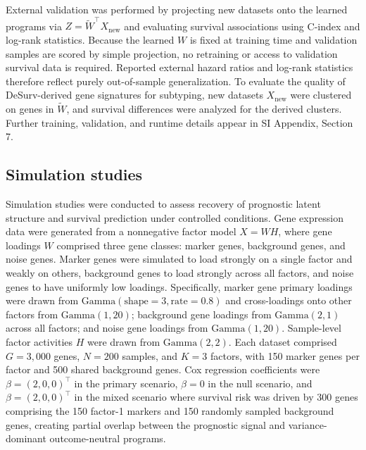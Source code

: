 \documentclass[9pt,twocolumn,twoside,]{pnas-new}
\begin{document}
External validation was performed by projecting new datasets onto the
learned programs via \(Z = \widetilde{W}^\top X_{\text{new}}\) and
evaluating survival associations using C-index and log-rank statistics.
Because the learned \(W\) is fixed at training time and validation
samples are scored by simple projection, no retraining or access to
validation survival data is required. Reported external hazard ratios
and log-rank statistics therefore reflect purely out-of-sample
generalization. To evaluate the quality of DeSurv-derived gene
signatures for subtyping, new datasets \(X_{\text{new}}\) were clustered
on genes in \(\widetilde{W}\), and survival differences were analyzed
for the derived clusters. Further training, validation, and runtime
details appear in SI Appendix, Section 7.

\subsection{Simulation studies}\label{simulation-studies}

Simulation studies were conducted to assess recovery of prognostic
latent structure and survival prediction under controlled conditions.
Gene expression data were generated from a nonnegative factor model
\(X=WH\), where gene loadings \(W\) comprised three gene classes: marker
genes, background genes, and noise genes. Marker genes were simulated to
load strongly on a single factor and weakly on others, background genes
to load strongly across all factors, and noise genes to have uniformly
low loadings. Specifically, marker gene primary loadings were drawn from
\(\text{Gamma}(\text{shape}=3, \text{rate}=0.8)\) and cross-loadings
onto other factors from \(\text{Gamma}(1, 20)\); background gene
loadings from \(\text{Gamma}(2, 1)\) across all factors; and noise gene
loadings from \(\text{Gamma}(1, 20)\). Sample-level factor activities
\(H\) were drawn from \(\text{Gamma}(2, 2)\). Each dataset comprised
\(G=3{,}000\) genes, \(N=200\) samples, and \(K=3\) factors, with 150
marker genes per factor and 500 shared background genes. Cox regression
coefficients were \(\beta = (2, 0, 0)^\top\) in the primary scenario,
\(\beta = 0\) in the null scenario, and \(\beta = (2, 0, 0)^\top\) in
the mixed scenario where survival risk was driven by 300 genes
comprising the 150 factor-1 markers and 150 randomly sampled background
genes, creating partial overlap between the prognostic signal and
variance-dominant outcome-neutral programs.
\end{document}
